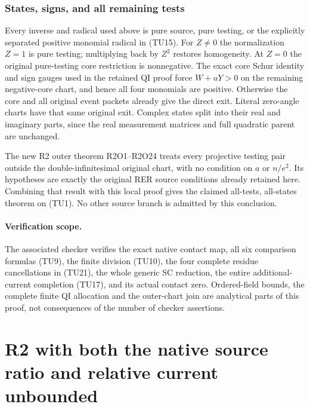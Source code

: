 \subsubsection*{States, signs, and all remaining tests}

Every inverse and radical used above is pure source, pure testing,
or the explicitly separated positive monomial radical in (TU15).
For $Z\ne0$ the normalization $Z=1$ is pure testing; multiplying
back by $Z^2$ restores homogeneity.  At $Z=0$ the original
pure-testing core restriction is nonnegative.  The exact core
Schur identity and sign gauges used in the retained QI proof
force $W+uY>0$ on the remaining negative-core chart, and hence
all four monomials are positive.  Otherwise the core and all
original event packets already give the direct exit.  Literal
zero-angle charts have that same original exit.  Complex states
split into their real and imaginary parts, since the real
measurement matrices and full quadratic parent are unchanged.

The new R2 outer theorem R2O1--R2O24 treats every projective
testing pair outside the double-infinitesimal original chart,
with no condition on $a$ or $n/e^2$.  Its hypotheses are exactly
the original RER source conditions already retained here.
Combining that result with this local proof gives the claimed
all-tests, all-states theorem on (TU1).  No other source branch
is admitted by this conclusion.

\paragraph{Verification scope.}
The associated checker verifies the exact native contact map,
all six comparison formulas (TU9), the finite division (TU10),
the four complete residue cancellations in (TU21),
the whole generic SC reduction, the entire additional-current
completion (TU17), and its actual contact zero.  Ordered-field
bounds, the complete finite QI allocation and the outer-chart
join are analytical parts of this proof, not consequences of
the number of checker assertions.


\section{\texorpdfstring{R2 with both the native source ratio and relative current unbounded}{R2 with both the native source ratio and relative current unbounded}}
\label{component:pef021eabacde}

